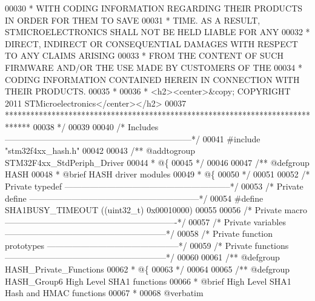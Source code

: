 \begin{DoxyCode}
00030 \textcolor{comment}{  * WITH CODING INFORMATION REGARDING THEIR PRODUCTS IN ORDER FOR THEM TO SAVE}
00031 \textcolor{comment}{  * TIME. AS A RESULT, STMICROELECTRONICS SHALL NOT BE HELD LIABLE FOR ANY}
00032 \textcolor{comment}{  * DIRECT, INDIRECT OR CONSEQUENTIAL DAMAGES WITH RESPECT TO ANY CLAIMS ARISING}
00033 \textcolor{comment}{  * FROM THE CONTENT OF SUCH FIRMWARE AND/OR THE USE MADE BY CUSTOMERS OF THE}
00034 \textcolor{comment}{  * CODING INFORMATION CONTAINED HEREIN IN CONNECTION WITH THEIR PRODUCTS.}
00035 \textcolor{comment}{  *}
00036 \textcolor{comment}{  * <h2><center>&copy; COPYRIGHT 2011 STMicroelectronics</center></h2>}
00037 \textcolor{comment}{  ******************************************************************************}
00038 \textcolor{comment}{  */}
00039 
00040 \textcolor{comment}{/* Includes ------------------------------------------------------------------*/}
00041 \textcolor{preprocessor}{#}\textcolor{preprocessor}{include} "stm32f4xx_hash.h"
00042 
00043 \textcolor{comment}{/** @addtogroup STM32F4xx\_StdPeriph\_Driver}
00044 \textcolor{comment}{  * @\{}
00045 \textcolor{comment}{  */}
00046 
00047 \textcolor{comment}{/** @defgroup HASH }
00048 \textcolor{comment}{  * @brief HASH driver modules}
00049 \textcolor{comment}{  * @\{}
00050 \textcolor{comment}{  */}
00051 
00052 \textcolor{comment}{/* Private typedef -----------------------------------------------------------*/}
00053 \textcolor{comment}{/* Private define ------------------------------------------------------------*/}
00054 \textcolor{preprocessor}{#}\textcolor{preprocessor}{define} \textcolor{preprocessor}{SHA1BUSY\_TIMEOUT}    \textcolor{preprocessor}{(}\textcolor{preprocessor}{(}\textcolor{preprocessor}{uint32\_t}\textcolor{preprocessor}{)} 0x00010000\textcolor{preprocessor}{)}
00055 
00056 \textcolor{comment}{/* Private macro -------------------------------------------------------------*/}
00057 \textcolor{comment}{/* Private variables ---------------------------------------------------------*/}
00058 \textcolor{comment}{/* Private function prototypes -----------------------------------------------*/}
00059 \textcolor{comment}{/* Private functions ---------------------------------------------------------*/}
00060 
00061 \textcolor{comment}{/** @defgroup HASH\_Private\_Functions}
00062 \textcolor{comment}{  * @\{}
00063 \textcolor{comment}{  */}
00064 
00065 \textcolor{comment}{/** @defgroup HASH\_Group6 High Level SHA1 functions}
00066 \textcolor{comment}{ *  @brief   High Level SHA1 Hash and HMAC functions }
00067 \textcolor{comment}{ *}
00068 \textcolor{comment}{@verbatim   }

\end{DoxyCode}
